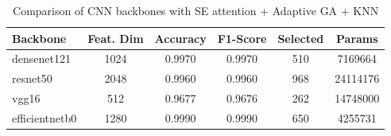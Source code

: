 \begin{table}[htbp]
\centering
\caption{Comparison of CNN backbones with SE attention + Adaptive GA + KNN}
\label{tab:table14}
\begin{tabular}{lccccc}
\toprule
Backbone & Feat. Dim & Accuracy & F1-Score & Selected & Params \\
\midrule
densenet121 & 1024 & 0.9970 & 0.9970 & 510 & 7169664 \\
resnet50 & 2048 & 0.9960 & 0.9960 & 968 & 24114176 \\
vgg16 & 512 & 0.9677 & 0.9676 & 262 & 14748000 \\
efficientnetb0 & 1280 & 0.9990 & 0.9990 & 650 & 4255731 \\
\bottomrule
\end{tabular}
\end{table}